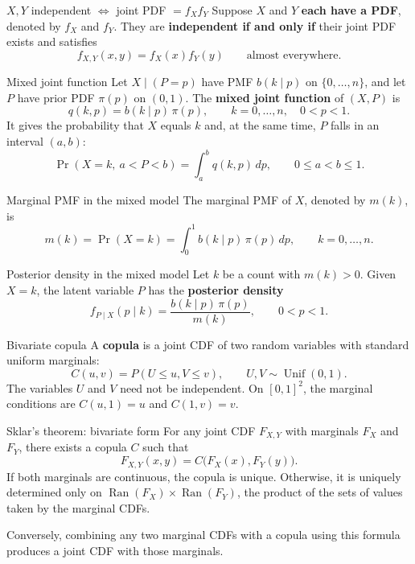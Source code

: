 \documentclass[12pt,a4paper,oneside]{report}
\begin{document}
\begin{framedprop}{$X,Y$ independent $\Longleftrightarrow$ joint PDF $=f_Xf_Y$}
\label{prop:independence-pdf}
Suppose $X$ and $Y$ \textbf{each have a PDF},
denoted by $f_X$ and $f_Y$. They are \textbf{independent if and only if}
their joint PDF exists and satisfies
\[
  f_{X,Y}(x,y)=f_X(x)f_Y(y)
  \qquad\text{almost everywhere}.
\]
\end{framedprop}

\begin{frameddefn}{Mixed joint function}
\label{def:mixed-joint-function}
Let $X\mid(P=p)$ have PMF $b(k\mid p)$ on $\{0,\ldots,n\}$, and let
$P$ have prior PDF $\pi(p)$ on $(0,1)$.
The \textbf{mixed joint function} of $(X,P)$ is
\[
  q(k,p)=b(k\mid p)\,\pi(p),
  \qquad k=0,\ldots,n,\quad 0<p<1.
\]
It gives the probability that $X$ equals $k$ and, at the same time,
$P$ falls in an interval $(a,b)$:
\[
  \Pr(X=k,\ a<P<b)=\int_a^b q(k,p)\,dp,
  \qquad 0\leq a<b\leq1.
\]
\end{frameddefn}

\begin{framedprop}{Marginal PMF in the mixed model}
\label{prop:mixed-marginal-pmf}
The marginal PMF of $X$, denoted by $m(k)$, is
\[
  m(k)=\Pr(X=k)=\int_0^1 b(k\mid p)\,\pi(p)\,dp,
  \qquad k=0,\ldots,n.
\]
\end{framedprop}

\begin{framedprop}{Posterior density in the mixed model}
Let $k$ be a count with $m(k)>0$. Given $X=k$, the latent variable
$P$ has the \textbf{posterior density}
\[
  f_{P\mid X}(p\mid k)=\frac{b(k\mid p)\,\pi(p)}{m(k)},
  \qquad 0<p<1.
\]
\end{framedprop}

\begin{frameddefn}{Bivariate copula}
A \textbf{copula} is a joint CDF of two random variables with
standard uniform marginals:
\[
  C(u,v)=P(U\leq u,V\leq v),
  \qquad U,V\sim\operatorname{Unif}(0,1).
\]
The variables $U$ and $V$ need not be independent. On $[0,1]^2$,
the marginal conditions are $C(u,1)=u$ and $C(1,v)=v$.
\end{frameddefn}

\begin{framedthm}{Sklar's theorem: bivariate form}
For any joint CDF $F_{X,Y}$ with marginals $F_X$ and $F_Y$,
there exists a copula $C$ such that
\[
  F_{X,Y}(x,y)=C\bigl(F_X(x),F_Y(y)\bigr).
\]
If both marginals are continuous, the copula is unique. Otherwise,
it is uniquely determined only on
$\operatorname{Ran}(F_X)\times\operatorname{Ran}(F_Y)$, the product
of the sets of values taken by the marginal CDFs.

Conversely, combining any two marginal CDFs with a copula using
this formula produces a joint CDF with those marginals.
\end{framedthm}
\end{document}
